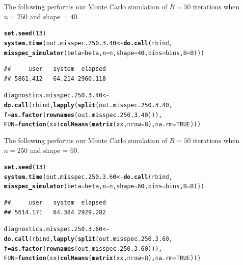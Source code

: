 \documentclass[11pt]{article}\usepackage[]{graphicx}\usepackage[]{color}
\makeatletter
\newcommand{\hlnum}[1]{\textcolor[rgb]{0.686,0.059,0.569}{#1}}%
\newcommand{\hlstd}[1]{\textcolor[rgb]{0.345,0.345,0.345}{#1}}%
\newcommand{\hlkwa}[1]{\textcolor[rgb]{0.161,0.373,0.58}{\textbf{#1}}}%
\newcommand{\hlkwb}[1]{\textcolor[rgb]{0.69,0.353,0.396}{#1}}%
\newcommand{\hlkwc}[1]{\textcolor[rgb]{0.333,0.667,0.333}{#1}}%
\newcommand{\hlkwd}[1]{\textcolor[rgb]{0.737,0.353,0.396}{\textbf{#1}}}%
\newenvironment{kframe}{%
 \def\at@end@of@kframe{}%
 \ifinner\ifhmode%
  \def\at@end@of@kframe{\end{minipage}}%
  \begin{minipage}{\columnwidth}%
 \fi\fi%
 \def\FrameCommand##1{\hskip\@totalleftmargin \hskip-\fboxsep
 \colorbox{shadecolor}{##1}\hskip-\fboxsep
     \hskip-\linewidth \hskip-\@totalleftmargin \hskip\columnwidth}%
 \MakeFramed {\advance\hsize-\width
   \@totalleftmargin\z@ \linewidth\hsize
   \@setminipage}}%
 {\par\unskip\endMakeFramed%
 \at@end@of@kframe}
\newenvironment{knitrout}{}{} %
\makeatother
\begin{document}
The following performs our Monte Carlo simulation of $B = 50$ iterations 
when $n = 250$ and shape = $40$.

\begin{knitrout}
\color{fgcolor}\begin{kframe}
\begin{alltt}
\hlkwd{set.seed}\hlstd{(}\hlnum{13}\hlstd{)}
\hlkwd{system.time}\hlstd{(out.misspec.250.3.40} \hlkwb{<-} \hlkwd{do.call}\hlstd{(rbind,}
  \hlkwd{misspec_simulator}\hlstd{(}\hlkwc{beta} \hlstd{= beta,} \hlkwc{n} \hlstd{= n,} \hlkwc{shape} \hlstd{=} \hlnum{40}\hlstd{,} \hlkwc{bins} \hlstd{= bins,} \hlkwc{B} \hlstd{= B)))}
\end{alltt}
\begin{verbatim}
##     user   system  elapsed 
## 5861.412   64.214 2960.118
\end{verbatim}
\begin{alltt}
\hlstd{diagnostics.misspec.250.3.40} \hlkwb{<-} \hlkwd{do.call}\hlstd{(rbind,} \hlkwd{lapply}\hlstd{(}\hlkwd{split}\hlstd{(out.misspec.250.3.40,}
  \hlkwc{f} \hlstd{=} \hlkwd{as.factor}\hlstd{(}\hlkwd{rownames}\hlstd{(out.misspec.250.3.40))),}
  \hlkwc{FUN} \hlstd{=} \hlkwa{function}\hlstd{(}\hlkwc{xx}\hlstd{)} \hlkwd{colMeans}\hlstd{(}\hlkwd{matrix}\hlstd{(xx,} \hlkwc{nrow} \hlstd{= B),} \hlkwc{na.rm} \hlstd{=} \hlnum{TRUE}\hlstd{)))}
\end{alltt}
\end{kframe}
\end{knitrout}


The following performs our Monte Carlo simulation of $B = 50$ iterations 
when $n = 250$ and shape = $60$.

\begin{knitrout}
\color{fgcolor}\begin{kframe}
\begin{alltt}
\hlkwd{set.seed}\hlstd{(}\hlnum{13}\hlstd{)}
\hlkwd{system.time}\hlstd{(out.misspec.250.3.60} \hlkwb{<-} \hlkwd{do.call}\hlstd{(rbind,}
  \hlkwd{misspec_simulator}\hlstd{(}\hlkwc{beta} \hlstd{= beta,} \hlkwc{n} \hlstd{= n,} \hlkwc{shape} \hlstd{=} \hlnum{60}\hlstd{,} \hlkwc{bins} \hlstd{= bins,} \hlkwc{B} \hlstd{= B)))}
\end{alltt}
\begin{verbatim}
##     user   system  elapsed 
## 5614.171   64.384 2929.282
\end{verbatim}
\begin{alltt}
\hlstd{diagnostics.misspec.250.3.60} \hlkwb{<-} \hlkwd{do.call}\hlstd{(rbind,} \hlkwd{lapply}\hlstd{(}\hlkwd{split}\hlstd{(out.misspec.250.3.60,}
  \hlkwc{f} \hlstd{=} \hlkwd{as.factor}\hlstd{(}\hlkwd{rownames}\hlstd{(out.misspec.250.3.60))),}
  \hlkwc{FUN} \hlstd{=} \hlkwa{function}\hlstd{(}\hlkwc{xx}\hlstd{)} \hlkwd{colMeans}\hlstd{(}\hlkwd{matrix}\hlstd{(xx,} \hlkwc{nrow} \hlstd{= B),} \hlkwc{na.rm} \hlstd{=} \hlnum{TRUE}\hlstd{)))}
\end{alltt}
\end{kframe}
\end{knitrout}
\end{document}
